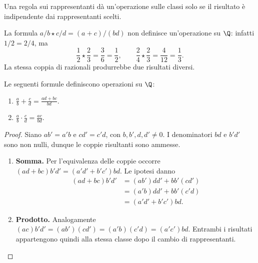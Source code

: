Una regola sui rappresentanti dà un'operazione sulle classi solo se il risultato è indipendente dai rappresentanti scelti.

\begin{esempio}
La formula $a/b\star c/d=(a+c)/(bd)$ non definisce un'operazione su $\Q$: infatti $1/2=2/4$, ma
\[
\frac12\star\frac23=\frac36=\frac12,\qquad
\frac24\star\frac23=\frac4{12}=\frac13.
\]
La stessa coppia di razionali produrrebbe due risultati diversi.
\end{esempio}

\begin{proposizione}
Le seguenti formule definiscono operazioni su $\Q$:
\begin{enumerate}[label=\arabic*.]
\item $\displaystyle\frac ab+\frac cd=\frac{ad+bc}{bd}$.
\item $\displaystyle\frac ab\cdot\frac cd=\frac{ac}{bd}$.
\end{enumerate}
\end{proposizione}
\begin{proof}
Siano $ab'=a'b$ e $cd'=c'd$, con $b,b',d,d'\ne0$. I denominatori $bd$ e $b'd'$ sono non nulli, dunque le coppie risultanti sono ammesse.

\begin{enumerate}[label=\arabic*.]
\item \textbf{Somma.} Per l'equivalenza delle coppie occorre $(ad+bc)b'd'=(a'd'+b'c')bd$. Le ipotesi danno
\[
\begin{aligned}
(ad+bc)b'd'&=(ab')dd'+bb'(cd')\\
&=(a'b)dd'+bb'(c'd)\\
&=(a'd'+b'c')bd.
\end{aligned}
\]
\item \textbf{Prodotto.} Analogamente $(ac)b'd'=(ab')(cd')=(a'b)(c'd)=(a'c')bd$. Entrambi i risultati appartengono quindi alla stessa classe dopo il cambio di rappresentanti.
\end{enumerate}
\end{proof}

